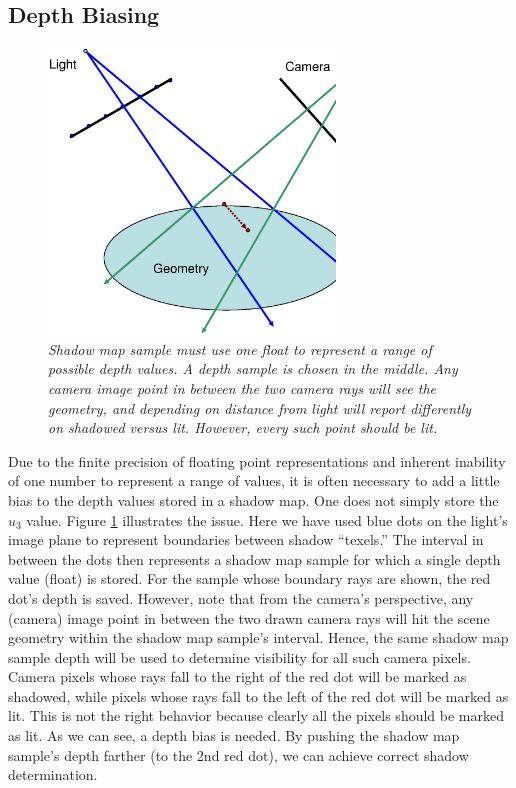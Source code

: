 \documentclass[]{article}  %
\begin{document}
\subsection{Depth Biasing}
\label{DepthBias}

\begin{figure}
	\centering
	  \vspace{-0.8in}
	  \hspace{-0.8in}
		\includegraphics[width=3in]{figure/depthbias.eps}
	\vspace{-1in}
	\caption{\em \small Shadow map sample must use one float to represent a range of possible depth values.  A depth sample is chosen in the middle.  Any camera image point in between the two camera rays will see the geometry, and depending on distance from light will report differently on shadowed versus lit.  However, every such point should be lit.}
	\label{fig:bias}
\end{figure}

Due to the finite precision of floating point representations and inherent inability of one number to represent a range of values, it is often necessary to add a little bias to the depth values stored in a shadow map.  One does not simply store the $u_3$ value.  Figure \ref{fig:bias} illustrates the issue.  Here we have used blue dots on the light's image plane to represent boundaries between shadow ``texels.''  The interval in between the dots then represents a shadow map sample for which a single depth value (float) is stored.  For the sample whose boundary rays are shown, the red dot's depth is saved.  However, note that from the camera's perspective, any (camera) image point in between the two drawn camera rays will hit the scene geometry within the shadow map sample's interval.  Hence, the same shadow map sample depth will be used to determine visibility for all such camera pixels.  Camera pixels whose rays fall to the right of the red dot will be marked as shadowed, while pixels whose rays fall to the left of the red dot will be marked as lit.  This is not the right behavior because clearly all the pixels should be marked as lit.  As we can see, a depth bias is needed.  By pushing the shadow map sample's depth farther (to the 2nd red dot), we can achieve correct shadow determination.  
\end{document}
